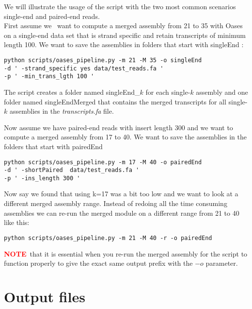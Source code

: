 \documentclass[12pt]{article}
\newcommand{\NOTE}{\textcolor{red}{\textbf{NOTE}}}
\begin{document}
We will illustrate the usage of the script with the two most common scenarios single-end and paired-end reads. \\
First assume we \ want to compute a merged assembly from 21 to 35 with Oases on a single-end data set that is strand specific and retain transcripts of minimum length 100. We want to save the assemblies in folders that start with singleEnd :
\begin{verbatim}
python scripts/oases_pipeline.py -m 21 -M 35 -o singleEnd 
-d ' -strand_specific yes data/test_reads.fa '
-p ' -min_trans_lgth 100 ' 
\end{verbatim}

The script creates a folder named singleEnd\_$k$ for each single-$k$ assembly and one folder named singleEndMerged that contains the merged transcripts for all single-$k$ assemblies in the \emph{transcripts.fa} file.

Now assume we have paired-end reads with insert length 300 and we want to compute a merged assembly from 17 to 40. We want to save the assemblies in the folders that start with pairedEnd
\begin{verbatim}
python scripts/oases_pipeline.py -m 17 -M 40 -o pairedEnd 
-d ' -shortPaired  data/test_reads.fa '
-p ' -ins_length 300 '
\end{verbatim}
Now say we found that using k=17 was a bit too low and we want to look at a different merged assembly range. Instead of redoing all the time consuming assemblies we can re-run the merged module on a different range from 21 to 40 like this:
\begin{verbatim}
python scripts/oases_pipeline.py -m 21 -M 40 -r -o pairedEnd  
\end{verbatim}
\NOTE \  that it is essential when you re-run the merged assembly for the script to function properly to give the exact same output prefix with the $-o$ parameter.
\section{Output files}
\end{document}

